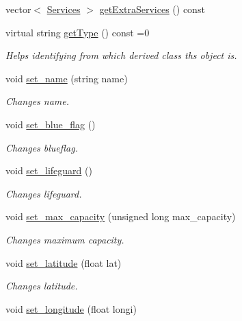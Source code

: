 \begin{DoxyCompactItemize}
\item 
vector$<$ \hyperlink{class_services}{Services} $>$ \hyperlink{class_beach_a69ce8d1f21dc1b81edd6df001ec6c2b2}{get\+Extra\+Services} () const
\item 
virtual string \hyperlink{class_beach_a30001df535b2456e47611c7a0705660b}{get\+Type} () const =0
\begin{DoxyCompactList}\small\item\em Helps identifying from which derived class ths object is. \end{DoxyCompactList}\item 
void \hyperlink{class_beach_acfca41723a51e0da9596facfafe8f6db}{set\+\_\+name} (string name)
\begin{DoxyCompactList}\small\item\em Changes name. \end{DoxyCompactList}\item 
\mbox{\label{class_beach_a019436b74c149f527a985f0c7c6fc8d2}} 
void \hyperlink{class_beach_a019436b74c149f527a985f0c7c6fc8d2}{set\+\_\+blue\+\_\+flag} ()
\begin{DoxyCompactList}\small\item\em Changes blueflag. \end{DoxyCompactList}\item 
\mbox{\label{class_beach_a861404c8f84396add0866190f1f83ecd}} 
void \hyperlink{class_beach_a861404c8f84396add0866190f1f83ecd}{set\+\_\+lifeguard} ()
\begin{DoxyCompactList}\small\item\em Changes lifeguard. \end{DoxyCompactList}\item 
void \hyperlink{class_beach_a952a4e75dd1e8200c6cc0bfde8728789}{set\+\_\+max\+\_\+capacity} (unsigned long max\+\_\+capacity)
\begin{DoxyCompactList}\small\item\em Changes maximum capacity. \end{DoxyCompactList}\item 
void \hyperlink{class_beach_a68a0fd1f91ee10e6acc9b676274bf2af}{set\+\_\+latitude} (float lat)
\begin{DoxyCompactList}\small\item\em Changes latitude. \end{DoxyCompactList}\item 
void \hyperlink{class_beach_af846ce1aabbd67742a4fef8fa64dcec8}{set\+\_\+longitude} (float longi)

\end{DoxyCompactItemize}
